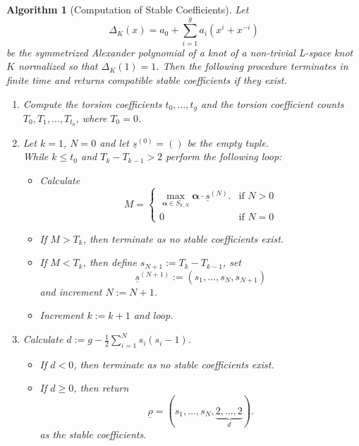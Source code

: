\documentclass{amsart} %
\theoremstyle{thm}
\newtheorem{alg}[Theorem]{Algorithm}
\theoremstyle{definition}
\numberwithin{equation}{section}
\begin{document}
\begin{alg}[Computation of Stable Coefficients]\label{alg:stablecoeff}
Let
\[\Delta_K(x) = a_0 + \sum_{i=1}^g a_i(x^i + x^{-i})\]
be the symmetrized Alexander polynomial of a knot of a non-trivial L-space knot $K$ normalized so that $\Delta_K(1)=1$. Then the following procedure terminates in finite time and returns compatible stable coefficients if they exist.
\begin{enumerate}
\item Compute the torsion coefficients $t_0, \dots, t_g$ and the torsion coefficient counts $T_0, T_1,\dots, T_{t_0}$, where $T_0=0$.
\item\label{step:recursive} Let $k=1$, $N=0$ and let $\underline{s}^{(0)}=()$ be the empty tuple.\\
 While $k\leq t_0$ and $T_{k}-T_{k-1}>2$ perform the following loop:
\begin{itemize}
\item Calculate 
\[
M=\begin{cases}
    \max_{\bm{\alpha}\in S_{k,N}}\bm{\alpha}\cdot \underline{s}^{(N)}. &\text{if $N>0$}\\
    0 &\text{if $N=0$}
\end{cases}
\]
\item If $M> T_k$, then terminate as no stable coefficients exist.
\item If $M <T_{k}$, then define $s_{N+1}:= T_{k}-T_{k-1}$, set
\[\underline{s}^{(N+1)}:=(s_1,\dots, s_N, s_{N+1})\]
and increment $N:=N+1$.
\item Increment $k:=k+1$ and loop.
\end{itemize}
\item\label{step:count2s} Calculate $d:= g - \frac12 \sum_{i=1}^{N} s_i(s_i-1)$.
\begin{itemize}
    \item If $d<0$, then terminate as no stable coefficients exist.
    \item If $d\geq 0$, then return
\[
\underline{\rho}=(s_1,\dots, s_{N}, \underbrace{2, \dots, 2}_{d}).
\]
as the stable coefficients.
\end{itemize}
\end{enumerate}
\end{alg}
\end{document}
